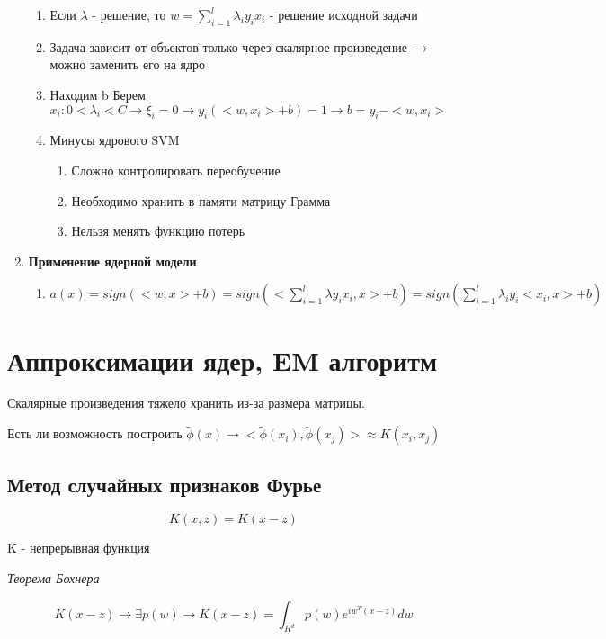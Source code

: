 \documentclass[a4paper, 12pt]{article}
\begin{document}
\begin{enumerate}
\begin{enumerate}
        \item Если $\lambda$ - решение, то $w = \sum_{i = 1}^l \lambda_i y_i x_i$ - решение исходной задачи
        \item Задача зависит от объектов только через скалярное произведение $\rightarrow$
        можно заменить его на ядро
        \item Находим b
        Берем $x_i: 0 < \lambda_i < C \rightarrow \xi_i = 0 \rightarrow y_i(<w, x_i> + b) = 1 \rightarrow b = y_i - <w, x_i>$
        \item Минусы ядрового SVM
        \begin{enumerate}
            \item Сложно контролировать переобучение
            \item Необходимо хранить в памяти матрицу Грамма
            \item Нельзя менять функцию потерь
        \end{enumerate}
    \end{enumerate}
    \item \textbf{Применение ядерной модели}
    \begin{enumerate}
        \item $a(x) = sign(<w, x> + b) = sign(<\sum_{i = 1}^l \lambda y_i x_i, x> + b) = sign(\sum_{i = 1}^l \lambda_i y_i <x_i, x> + b)$ 
    \end{enumerate}
\end{enumerate}

\section{Аппроксимации ядер, EM алгоритм}

Скалярные произведения тяжело хранить из-за
размера матрицы. 

Есть ли возможность построить 
$\tilde{\phi}(x) \rightarrow 
<\tilde{\phi}(x_i), \tilde{\phi}(x_j)> 
\approx K(x_i, x_j)$

\subsection{Метод случайных признаков Фурье}

\[K(x, z) = K(x - z)\]

K - непрерывная функция

\textit{Теорема Бохнера}

\[K(x - z) \rightarrow \exists p(w) \rightarrow 
K(x - z) = \int_{R^{d}} p(w)e^{iw^{T}(x - z)}dw\]
\end{document}
